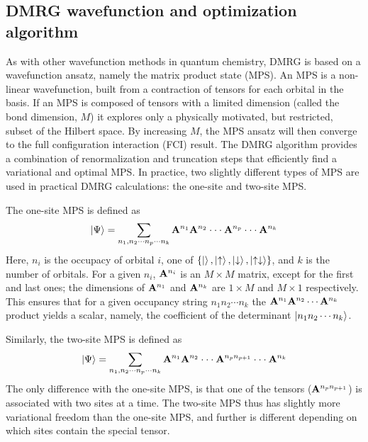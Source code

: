 
\subsection{DMRG wavefunction and optimization algorithm}

As with other wavefunction methods in quantum chemistry, DMRG is based on a wavefunction ansatz, namely the matrix product state (MPS).
An MPS is a non-linear wavefunction, built from a contraction of tensors for each orbital in the basis. If an MPS is
composed of tensors with a limited dimension (called the bond dimension, $M$) it explores only a physically motivated, but restricted, subset of the Hilbert space. 
By increasing $M$, the MPS ansatz will then converge to the full configuration interaction (FCI) result. The DMRG algorithm provides a combination of 
renormalization and truncation steps that efficiently find a variational and optimal MPS. 
In practice, two slightly different types of MPS are used in practical
DMRG calculations: the one-site and two-site MPS. 

The one-site MPS is defined as
\begin{equation}
  \ket{\Psi}= \sum_{\substack{n_1, n_2\cdot\cdot\cdot n_p\cdot\cdot\cdot n_k}} {\bf A}^{n_1}{\bf A}^{n_2}\cdot\cdot\cdot {\bf A}^{n_{p}} \cdot\cdot\cdot{\bf A}^{n_k}
\end{equation}
Here, $n_i$ is the occupacy of orbital $i$, one of $ \{\ket{}, \ket{\uparrow}, \ket{\downarrow}, \ket{\uparrow\downarrow}\}$, and $k$ is the number of orbitals. 
For a given $n_i$, ${\bf A}^{n_i}$ is  an $M\times M$ matrix, except for the first and last ones; the dimensions of ${\bf A}^{n_1}$ and ${\bf A}^{n_k}$ are $1\times M$ and $M\times 1$ respectively.
This ensures that for a given occupancy string $n_1n_2\cdots n_k$  the ${\bf A}^{n_1}{\bf A}^{n_2}\cdots{\bf A}^{n_k}$ product yields a scalar, 
namely, the coefficient of the determinant $\ket{n_1n_2\cdots n_k}$.

Similarly, the two-site MPS is defined as
\begin{equation}
  \ket{\Psi}= \sum_{\substack{n_1, n_2\cdot\cdot\cdot n_p\cdot\cdot\cdot n_k}} {\bf A}^{n_1}{\bf A}^{n_2}\cdot\cdot\cdot {\bf A}^{n_{p}n_{p+1}} \cdot\cdot\cdot{\bf A}^{n_k}
\end{equation}
The only difference with the one-site MPS, is that one of the tensors (${\bf A}^{n_p n_{p+1}}$) is associated with two sites at a time. The two-site MPS thus
has slightly more variational freedom than the one-site MPS, and further
is different depending on which sites contain the special tensor.

